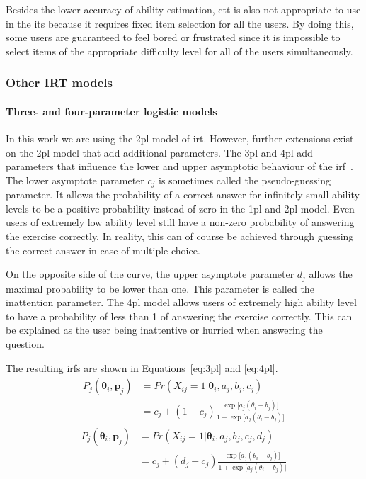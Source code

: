 Besides the lower accuracy of ability estimation, \gls{ctt} is also not appropriate to use in the \gls{its} because it requires fixed item selection for all the users.
By doing this, some users are guaranteed to feel bored or frustrated since it is impossible to select items of the appropriate difficulty level for all of the users simultaneously.

\subsubsection{Other IRT models}
\paragraph{Three- and four-parameter logistic models}
In this work we are using the \gls{2pl} model of \gls{irt}.
However, further extensions exist on the \gls{2pl} model that add additional parameters.
The \gls{3pl} and \gls{4pl} add parameters that influence the lower and upper asymptotic behaviour of the \gls{irf}~\cite{magis2017computerized}.
The lower asymptote parameter $c_j$ is sometimes called the pseudo-guessing parameter. 
It allows the probability of a correct answer for infinitely small ability levels to be a positive probability instead of zero in the \gls{1pl} and \gls{2pl} model. 
Even users of extremely low ability level still have a non-zero probability of answering the exercise correctly.
In reality, this can of course be achieved through guessing the correct answer in case of multiple-choice.

On the opposite side of the curve, the upper asymptote parameter $d_j$ allows the maximal probability to be lower than one. 
This parameter is called the inattention parameter. 
The \gls{4pl} model allows users of extremely high ability level to have a probability of less than 1 of answering the exercise correctly.
This can be explained as the user being inattentive or hurried when answering the question.

The resulting \glspl{irf} are shown in Equations~\ref{eq:3pl} and \ref{eq:4pl}.
\begin{equation}
\begin{split}
    \label{eq:3pl}
    P_{j}(\bm{\theta}_i,\bm{p}_j)
    & = Pr(X_{ij} = 1 | \bm{\theta}_i,a_j,b_j,c_j) \\
    & = c_j + (1-c_j) \frac{\exp\big[a_j(\theta_i - b_j)\big]}{1 + \exp\big[a_j(\theta_i - b_j)\big]}
\end{split}
\end{equation}
\begin{equation}
\begin{split}
    \label{eq:4pl}
    P_{j}(\bm{\theta}_i,\bm{p}_j)
    & = Pr(X_{ij} = 1 | \bm{\theta}_i,a_j,b_j,c_j,d_j)\\
    & = c_j + (d_j-c_j) \frac{\exp\big[a_j(\theta_i - b_j)\big]}{1 + \exp\big[a_j(\theta_i - b_j)\big]}
\end{split}
\end{equation}

